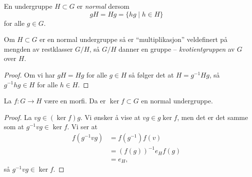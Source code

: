 \begin{definition}
    En undergruppe $H\subset G$ er \textit{normal}
    dersom
    \[
        gH = Hg = \{hg\mid h\in H\}
    \]
    for alle $g\in G$.
\end{definition}

\begin{lemma}
    Om $H\subset G$ er en normal undergruppe så er ``multiplikasjon''
    veldefinert på mengden av restklasser $G / H$,
    så $G / H$ danner en gruppe -- \textit{kvotientgruppen} av $G$ over $H$.
\end{lemma}
\begin{proof}
    Om vi har $gH = Hg$ for alle $g\in H$ så følger det at
    $H = g^{-1} H g$,
    så $g^{-1}h g\in H$ for alle $h\in H$.
\end{proof}

\begin{lemma}
    La $f\colon G\to H$ være en morfi.
    Da er $\ker f\subset G$ en normal undergruppe.
\end{lemma}
\begin{proof}
    La $vg\in(\ker f) g$.
    Vi ønsker å vise at $vg\in g\ker f$,
    men det er det samme som at $g^{-1} vg\in \ker f$.
    Vi ser at
    \[\begin{aligned}
        f(g^{-1}vg)
        &= f(g^{-1})f(v)
        \\
        &= {(f(g))}^{-1} e_H f(g)
        \\
        &= e_H,
    \end{aligned}\]
    så $g^{-1} vg\in \ker f$.
\end{proof}

